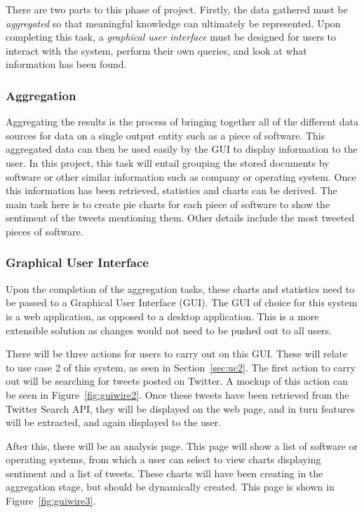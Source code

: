 There are two parts to this phase of project. Firstly, the data gathered must be \emph{aggregated} so that meaningful knowledge can ultimately be represented. Upon completing this task, a \emph{graphical user interface} must be designed for users to interact with the system, perform their own queries, and look at what information has been found.

\subsubsection{Aggregation}
Aggregating the results is the process of bringing together all of the different data sources for data on a single output entity such as a piece of software. This aggregated data can then be used easily by the GUI to display information to the user. In this project, this task will entail grouping the stored documents by software or other similar information such as company or operating system. Once this information has been retrieved, statistics and charts can be derived. The main task here is to create pie charts for each piece of software to show the sentiment of the tweets mentioning them. Other details include the most tweeted pieces of software.

\subsubsection{Graphical User Interface}
\label{sec:guid}
Upon the completion of the aggregation tasks, these charts and statistics need to be passed to a Graphical User Interface (GUI). The GUI of choice for this system is a web application, as opposed to a desktop application. This is a more extensible solution as changes would not need to be pushed out to all users.

There will be three actions for users to carry out on this GUI. These will relate to use case 2 of this system, as seen in Section~\ref{sec:uc2}. The first action to carry out will be searching for tweets posted on Twitter. A mockup of this action can be seen in Figure~\ref{fig:guiwire2}. Once these tweets have been retrieved from the Twitter Search API, they will be displayed on the web page, and in turn features will be extracted, and again displayed to the user.

After this, there will be an analysis page. This page will show a list of software or operating systems, from which a user can select to view charts displaying sentiment and a list of tweets. These charts will have been creating in the aggregation stage, but should be dynamically created. This page is shown in Figure~\ref{fig:guiwire3}.

